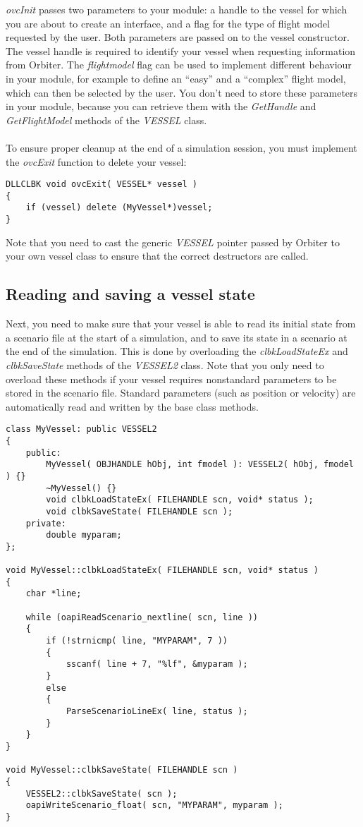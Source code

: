 \documentclass[Orbiter Developer Manual.tex]{subfiles}
\begin{document}
\noindent
\textit{ovcInit} passes two parameters to your module: a handle to the vessel for which you are about to create an interface, and a flag for the type of flight model requested by the user. Both parameters are passed on to the vessel constructor. The vessel handle is required to identify your vessel when requesting information from Orbiter. The \textit{flightmodel} flag can be used to implement different behaviour in your module, for example to define an “easy” and a “complex” flight model, which can then be selected by the user. You don’t need to store these parameters in your module, because you can retrieve them with the \textit{GetHandle} and \textit{GetFlightModel} methods of the \textit{VESSEL} class.\\
\\
To ensure proper cleanup at the end of a simulation session, you must implement the \textit{ovcExit} function to delete your vessel:

\begin{lstlisting}
DLLCLBK void ovcExit( VESSEL* vessel )
{
	if (vessel) delete (MyVessel*)vessel;
}
\end{lstlisting}

\noindent
Note that you need to cast the generic \textit{VESSEL} pointer passed by Orbiter to your own vessel class to ensure that the correct destructors are called.


\subsection{Reading and saving a vessel state}
Next, you need to make sure that your vessel is able to read its initial state from a scenario file at the start of a simulation, and to save its state in a scenario at the end of the simulation. This is done by overloading the \textit{clbkLoadStateEx} and \textit{clbkSaveState} methods of the \textit{VESSEL2} class. Note that you only need to overload these methods if your vessel requires nonstandard parameters to be stored in the scenario file. Standard parameters (such as position or velocity) are automatically read and written by the base class methods.

\begin{lstlisting}
class MyVessel: public VESSEL2
{
	public:
		MyVessel( OBJHANDLE hObj, int fmodel ): VESSEL2( hObj, fmodel ) {}
		~MyVessel() {}
		void clbkLoadStateEx( FILEHANDLE scn, void* status );
		void clbkSaveState( FILEHANDLE scn );
	private:
		double myparam;
};

void MyVessel::clbkLoadStateEx( FILEHANDLE scn, void* status )
{
	char *line;

	while (oapiReadScenario_nextline( scn, line ))
	{
		if (!strnicmp( line, "MYPARAM", 7 ))
		{
			sscanf( line + 7, "%lf", &myparam );
		}
		else
		{
			ParseScenarioLineEx( line, status );
		}
	}
}

void MyVessel::clbkSaveState( FILEHANDLE scn )
{
	VESSEL2::clbkSaveState( scn );
	oapiWriteScenario_float( scn, "MYPARAM", myparam );
}
\end{lstlisting}
\end{document}
